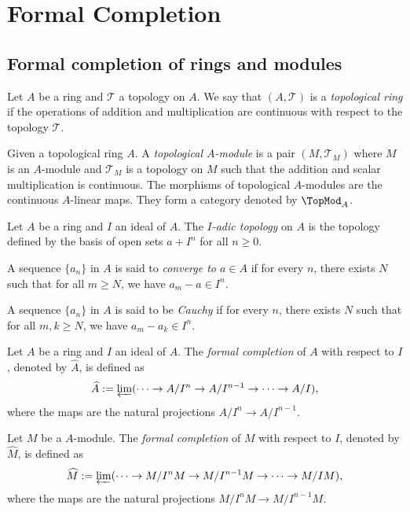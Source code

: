 \section{Formal Completion}

\subsection{Formal completion of rings and modules}

    \begin{definition}\label{def: topological ring and topological modules}
        Let \(A\) be a ring and \(\mathcal{T}\) a topology on \(A\).
        We say that \((A, \mathcal{T})\) is a \emph{topological ring} if the operations of addition and multiplication are continuous with respect to the topology \(\mathcal{T}\).
        
        Given a topological ring \(A\).
        A \emph{topological \(A\)-module} is a pair \((M, \mathcal{T}_M)\) where \(M\) is an \(A\)-module and \(\mathcal{T}_M\) is a topology on \(M\) such that the addition and scalar multiplication is continuous.
        The morphisms of topological \(A\)-modules are the continuous \(A\)-linear maps.
        They form a category denoted by \(\TopMod_A\).
    \end{definition}

    \begin{definition}\label{def: I-adic topology}
        Let \(A\) be a ring and \(I\) an ideal of \(A\). 
        The \emph{\(I\)-adic topology} on \(A\) is the topology defined by the basis of open sets \(a + I^n\) for all \(n \geq 0\).

        A sequence \(\{a_n\}\) in \(A\) is said to \emph{converge to \(a \in A\)} if for every \(n\), there exists \(N\) such that for all \(m \geq N\), we have \(a_m - a \in I^n\).

        A sequence \(\{a_n\}\) in \(A\) is said to be \emph{Cauchy} if for every \(n\), there exists \(N\) such that for all \(m, k \geq N\), we have \(a_m - a_k \in I^n\).
    \end{definition}

    \begin{definition}\label{def: formal completion}
        Let \(A\) be a ring and \(I\) an ideal of \(A\). 
        The \emph{formal completion} of \(A\) with respect to \(I\), denoted by \(\widehat{A}\), is defined as 
        \[ \widehat{A} := \varprojlim ( \cdots \to A/I^n \to A/I^{n-1} \to \cdots \to A/I), \]
        where the maps are the natural projections \(A/I^n \to A/I^{n-1}\).

        Let \(M\) be a \(A\)-module.
        The \emph{formal completion} of \(M\) with respect to \(I\), denoted by \(\widehat{M}\), is defined as
        \[ \widehat{M} := \varprojlim ( \cdots \to M/I^n M \to M/I^{n-1} M \to \cdots \to M/I M), \]
        where the maps are the natural projections \(M/I^n M \to M/I^{n-1} M\).
    \end{definition}

